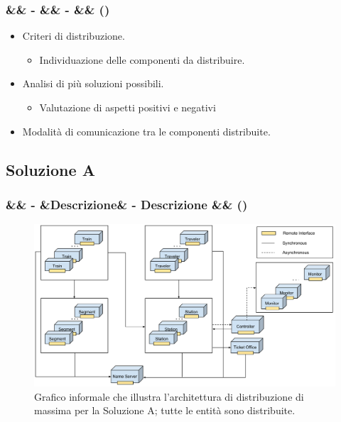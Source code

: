 \documentclass[slidestop,compress,blackandwhite]{beamer}
\newcommand{\ii}[1]{\textit{#1}}
\newcommand{\treno}{\ii{treno}}
\newcommand{\treni}{\ii{treni}}
\newcommand{\viaggiatore}{\ii{viaggiatore}}
\newcommand{\viaggiatori}{\ii{viaggiatori}}
\newcommand{\stazione}{\ii{stazione}}
\newcommand{\stazioni}{\ii{stazioni}}
\newcommand{\biglietteria}{\ii{biglietteria}}
\newcommand{\controller}{\ii{controllo centrale}}
\newcommand{\newtitle}[4]{
	#1 
	\ifx&#2&%
	\else
  		\large- #2
	\fi
	\ifx&#3&%
	\else
  		\normalsize- #3
	\fi
	\ifx&#4&%
	\else
  		\normalsize (#4)
	\fi
}
\newcommand{\newframe}[5]{
	\begin{frame}
		\frametitle{\newtitle{#1}{#2}{#3}{#4}}
		#5
	\end{frame}
}
\newcommand{\myitemize}[1]{\begin{itemize}#1\end{itemize}}
\begin{document}
	\newframe{}{}{}{}{
		
		\begin{itemize}
			\item Criteri di distribuzione.
				\myitemize{
					\item Individuazione delle componenti da distribuire.
				}
			\item Analisi di più soluzioni possibili.
				\myitemize{
					\item Valutazione di aspetti positivi e negativi
				}
			\item Modalità di comunicazione tra le componenti distribuite.
		\end{itemize}
		
		
	}
	
	\subsection{Soluzione A}\label{sol_a}
	
	
	\newframe{}{}{Descrizione}{}{
		\begin{figure}
			\includegraphics[scale=0.24,trim=0mm 5mm 0mm 35mm]{imgs/All_distributed.pdf}
			\caption{\scriptsize Grafico informale che illustra l'architettura di distribuzione di massima per la Soluzione A; tutte le entità sono distribuite.}
		\end{figure}
	}
	
\end{document}
